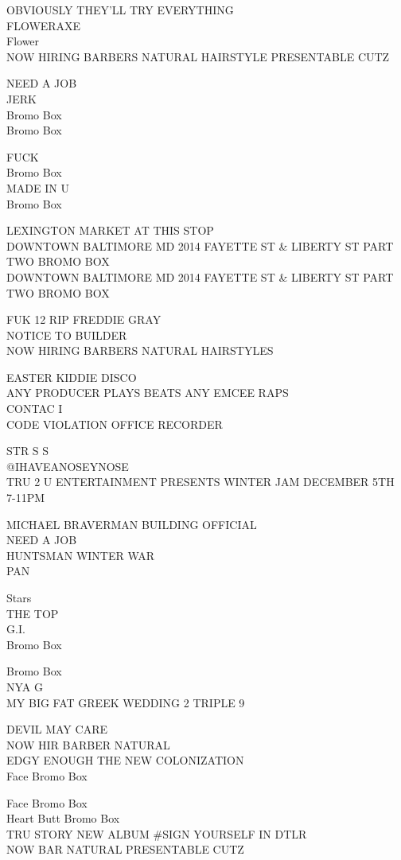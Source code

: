 \documentclass[10pt,letterpaper]{article}
\begin{document}
OBVIOUSLY THEY'LL TRY EVERYTHING\\
FLOWERAXE\\
Flower\\
NOW HIRING BARBERS NATURAL HAIRSTYLE PRESENTABLE CUTZ

NEED A JOB\\
JERK\\
Bromo Box\\
Bromo Box

FUCK\\
Bromo Box\\
MADE IN U\\
Bromo Box

LEXINGTON MARKET AT THIS STOP\\
DOWNTOWN BALTIMORE MD 2014 FAYETTE ST \& LIBERTY ST PART TWO BROMO BOX\\
DOWNTOWN BALTIMORE MD 2014 FAYETTE ST \& LIBERTY ST PART TWO BROMO BOX

FUK 12 RIP FREDDIE GRAY\\
NOTICE TO BUILDER\\
NOW HIRING BARBERS NATURAL HAIRSTYLES

EASTER KIDDIE DISCO\\
ANY PRODUCER PLAYS BEATS ANY EMCEE RAPS\\
CONTAC I\\
CODE VIOLATION OFFICE RECORDER

STR S S\\
@IHAVEANOSEYNOSE\\
TRU 2 U ENTERTAINMENT PRESENTS WINTER JAM DECEMBER 5TH 7{-}11PM

MICHAEL BRAVERMAN BUILDING OFFICIAL\\
NEED A JOB\\
HUNTSMAN WINTER WAR\\
PAN

Stars\\
THE TOP\\
G.I.\\
Bromo Box

Bromo Box\\
NYA G\\
MY BIG FAT GREEK WEDDING 2 TRIPLE 9

DEVIL MAY CARE\\
NOW HIR BARBER NATURAL\\
EDGY ENOUGH THE NEW COLONIZATION\\
Face Bromo Box

Face Bromo Box\\
Heart Butt Bromo Box\\
TRU STORY NEW ALBUM \#SIGN YOURSELF IN DTLR\\
NOW BAR NATURAL PRESENTABLE CUTZ
\end{document}
